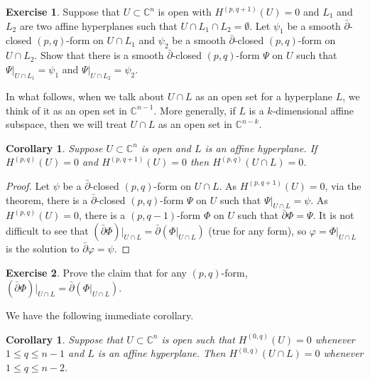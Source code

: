 \documentclass[12pt,openany]{book}
\newcommand{\C}{{\mathbb{C}}}
\theoremstyle{plain}
\newtheorem{cor}[thm]{Corollary}
\theoremstyle{remark}
\theoremstyle{definition}
\newenvironment{exbox}{%
    \def\FrameCommand{\vrule width 1pt \relax\hspace{10pt}}%
    \MakeFramed{\advance\hsize-\width\FrameRestore}%
}{%
    \endMakeFramed
}
\theoremstyle{exercise}
\newtheorem{exercise}{Exercise}[section]
\theoremstyle{example}
\begin{document}
\begin{exbox}
\begin{exercise}
Suppose that $U \subset \C^n$ is open with $H^{(p,q+1)}(U) = 0$ and
$L_1$ and $L_2$ are two affine hyperplanes such that $U \cap L_1 \cap L_2 =
\emptyset$.
Let $\psi_1$ be a smooth $\bar{\partial}$-closed $(p,q)$-form on
$U \cap L_1$
and $\psi_2$ be a smooth $\bar{\partial}$-closed $(p,q)$-form on
$U \cap L_2$.  Show that there is a smooth
$\bar{\partial}$-closed $(p,q)$-form
$\Psi$ on $U$ such that
$\Psi|_{U \cap L_1} = \psi_1$
and
$\Psi|_{U \cap L_2} = \psi_2$.
\end{exercise}
\end{exbox}

In what follows, when we talk about $U \cap L$ as an open set for a hyperplane
$L$, we think of it as an open set in $\C^{n-1}$.  More generally, if $L$
is a $k$-dimensional affine subspace, then we will treat $U \cap L$
as an open set in $\C^{n-k}$.

\begin{cor}
Suppose $U \subset \C^n$ is open and $L$ is an affine hyperplane.
If $H^{(p,q)}(U) = 0$ and
$H^{(p,q+1)}(U) = 0$ then $H^{(p,q)}(U \cap L) = 0$.
\end{cor}

\begin{proof}
Let $\psi$ be a $\bar{\partial}$-closed $(p,q)$-form on $U \cap L$.
As $H^{(p,q+1)}(U) = 0$, via the theorem,
there is a $\bar{\partial}$-closed $(p,q)$-form
$\Psi$ on $U$ such that
$\Psi|_{U \cap L} = \psi$.
As $H^{(p,q)}(U) = 0$, there is a $(p,q-1)$-form $\Phi$ on $U$
such that $\bar{\partial} \Phi = \Psi$.  It is not difficult to see that
$(\bar{\partial}\Phi)|_{U \cap L} = \bar{\partial}(\Phi|_{U \cap L})$ (true for any form),
so $\varphi = \Phi|_{U \cap L}$ is the solution to $\bar{\partial} \varphi = \psi$.
\end{proof}

\begin{exbox}
\begin{exercise}
Prove the claim that
for any $(p,q)$-form, $(\bar{\partial}\Phi)|_{U \cap L} =
\bar{\partial}(\Phi|_{U \cap L})$.
\end{exercise}
\end{exbox}

We have the following immediate corollary.

\begin{cor} \label{cor:dolgodown}
Suppose that $U \subset \C^n$ is open
such that $H^{(0,q)}(U) = 0$ whenever $1 \leq q \leq n-1$
and $L$ is an affine hyperplane.
Then $H^{(0,q)}(U \cap L) = 0$ whenever $1 \leq q \leq n-2$.
\end{cor}
\end{document}
